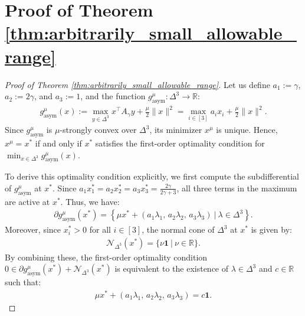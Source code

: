 \documentclass{article}
\newcommand{\R}{\mathbb{R}}
\newcommand{\bone}{\mathbf{1}}
\theoremstyle{plain}
\begin{document}
\section{Proof of Theorem \ref{thm:arbitrarily_small_allowable_range}}
\label{sec:appx_proof_for_arbitrarily_small_allowable_range}

\begin{proof}[Proof of Theorem \ref{thm:arbitrarily_small_allowable_range}]
    Let us define $a_1 := \gamma$, $a_2 := 2\gamma$, and $a_3 := 1$, and the function $g_{\mathrm{asym}}^{\mu}: \Delta^3 \to \R$:
    \begin{align*}
        g_{\mathrm{asym}}^{\mu}(x) := \max_{y \in \Delta^3} x^\top A_\gamma y + \frac{\mu}{2}\|x\|^2 = \max_{i\in [3]} a_i x_i + \frac{\mu}{2}\|x\|^2.
    \end{align*}
    Since $g_{\mathrm{asym}}^{\mu}$ is $\mu$-strongly convex over $\Delta^3$, its minimizer $x^\mu$ is unique.
    Hence, $x^\mu = x^\ast$ if and only if $x^\ast$ satisfies the first-order optimality condition for $\min_{x\in \Delta^3} g_{\mathrm{asym}}^{\mu}(x)$.

    To derive this optimality condition explicitly, we first compute the subdifferential of $g_{\mathrm{asym}}^{\mu}$ at $x^\ast$.
    Since $a_1 x_1^\ast = a_2 x_2^\ast = a_3 x_3^\ast = \frac{2\gamma}{2\gamma+3}$, all three terms in the maximum are active at $x^\ast$.
    Thus, we have:
    \begin{align*}
        \partial g_{\mathrm{asym}}^{\mu}(x^\ast) = \left\{\mu x^\ast + (a_1\lambda_1,\, a_2\lambda_2,\, a_3\lambda_3) ~|~ \lambda\in \Delta^3\right\}.
    \end{align*}
    Moreover, since $x_i^\ast > 0$ for all $i \in [3]$, the normal cone of $\Delta^3$ at $x^\ast$ is given by:
    \begin{align*}
        \mathcal{N}_{\Delta^3}(x^\ast) = \{\nu\bone ~|~ \nu \in \R\}.
    \end{align*}
    By combining these, the first-order optimality condition $0 \in \partial g_{\mathrm{asym}}^{\mu}(x^\ast) + \mathcal{N}_{\Delta^3}(x^\ast)$ is equivalent to the existence of $\lambda \in \Delta^3$ and $c \in \R$ such that:
    \begin{align}
        \mu x^\ast + (a_1\lambda_1,\, a_2\lambda_2,\, a_3\lambda_3) = c\bone.
        \label{eq:kkt_for_xstar_in_example}
    \end{align}


\end{proof}
\end{document}
